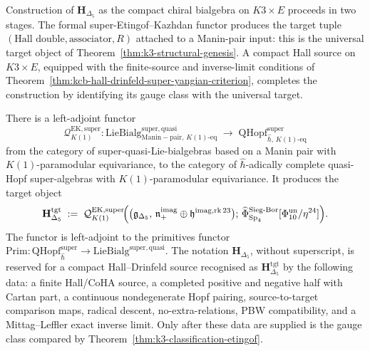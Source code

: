 Construction of $\mathbf{H}_{\Delta_5}$ as the compact chiral bialgebra
on $K3 \times E$ proceeds in two stages. The formal
super-Etingof--Kazhdan functor produces the target tuple $(\text{Hall
double}, \text{associator}, R)$ attached to a Manin-pair input: this is
the universal target object of Theorem~\ref{thm:k3-structural-genesis}.
A compact Hall source on $K3 \times E$, equipped with the
finite-source and inverse-limit conditions of
Theorem~\ref{thm:kcb-hall-drinfeld-super-yangian-criterion}, completes
the construction by identifying its gauge class with the universal
target.

\begin{theorem}
\label{thm:k3-structural-genesis}
There is a left-adjoint functor
\[
 \mathcal{Q}^{\mathrm{EK,super}}_{K(1)}\colon
 \mathrm{LieBialg}^{\mathrm{super,quasi}}_{\mathrm{Manin-pair},\,K(1)\text{-eq}}
 \;\longrightarrow\;
 \mathrm{QHopf}^{\mathrm{super}}_{\widehat{\hbar},\,K(1)\text{-eq}}
\]
from the category of super-quasi-Lie-bialgebras based on a Manin pair with
$K(1)$-paramodular equivariance, to the category of $\widehat{\hbar}$-adically
complete quasi-Hopf super-algebras with $K(1)$-paramodular equivariance.  It
produces the target object
\[
 \mathbf{H}_{\Delta_5}^{\mathrm{tgt}}
 \;:=\;
 \mathcal{Q}^{\mathrm{EK,super}}_{K(1)}\!\Bigl(\bigl(\mathfrak{g}_{\Delta_5},\,
 \mathfrak{n}_+^{\mathrm{imag}}\oplus\mathfrak{h}^{\mathrm{imag,rk\,23}}\bigr);\,
 \widehat{\Phi}^{\mathrm{Sieg\text{-}Bor}}_{\mathrm{Sp}_4}[\Phi_{10}^{\mathrm{un}}/\eta^{24}]\Bigr).
\]
The functor is left-adjoint to the primitives functor
$\mathrm{Prim}\colon \mathrm{QHopf}^{\mathrm{super}}_{\widehat{\hbar}} \to
\mathrm{LieBialg}^{\mathrm{super,quasi}}$.  The notation
$\mathbf{H}_{\Delta_5}$, without superscript, is reserved for a compact
Hall--Drinfeld source recognised as $\mathbf{H}_{\Delta_5}^{\mathrm{tgt}}$
by the following data: a finite Hall/CoHA source, a completed positive and
negative half with Cartan part, a continuous nondegenerate Hopf pairing,
source-to-target comparison maps, radical descent, no-extra-relations,
PBW compatibility, and a Mittag--Leffler exact inverse limit.  Only after
these data are supplied is the gauge class compared by
Theorem~\ref{thm:k3-classification-etingof}.
\end{theorem}


